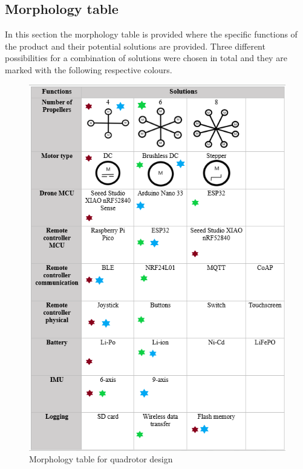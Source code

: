 \subsection{Morphology table}

In this section the morphology table is provided where the specific functions of the product and their potential solutions are provided. Three different possibilities for a combination of solutions were chosen in total and they are marked with the following respective colours.

\begin{figure}[H]
    \begin{center}
    \includegraphics[scale=0.9]{pictures/Morphology_with_solutions.png}
    \end{center}
    \caption{Morphology table for quadrotor design}
    \label{fig:morphology}
\end{figure}